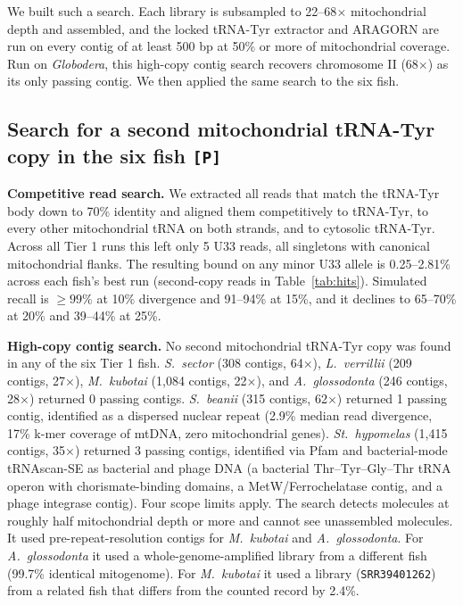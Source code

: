 \documentclass[11pt, a4paper]{article}
\begin{document}
We built such a search. Each library is subsampled to 22--68$\times$ mitochondrial depth and assembled, and the locked tRNA-Tyr extractor and ARAGORN are run on every contig of at least 500 bp at 50\% or more of mitochondrial coverage. Run on \textit{Globodera}, this high-copy contig search recovers chromosome II (68$\times$) as its only passing contig. We then applied the same search to the six fish.

\subsection{Search for a second mitochondrial tRNA-Tyr copy in the six fish \texttt{[P]}}\label{sec:second}
\textbf{Competitive read search.} We extracted all reads that match the tRNA-Tyr body down to 70\% identity and aligned them competitively to tRNA-Tyr, to every other mitochondrial tRNA on both strands, and to cytosolic tRNA-Tyr. Across all Tier 1 runs this left only 5 U33 reads, all singletons with canonical mitochondrial flanks. The resulting bound on any minor U33 allele is 0.25--2.81\% across each fish's best run (second-copy reads in Table~\ref{tab:hits}). Simulated recall is $\ge 99\%$ at 10\% divergence and 91--94\% at 15\%, and it declines to 65--70\% at 20\% and 39--44\% at 25\%.

\textbf{High-copy contig search.} No second mitochondrial tRNA-Tyr copy was found in any of the six Tier 1 fish. \textit{S.\ sector} (308 contigs, 64$\times$), \textit{L.\ verrillii} (209 contigs, 27$\times$), \textit{M.\ kubotai} (1,084 contigs, 22$\times$), and \textit{A.\ glossodonta} (246 contigs, 28$\times$) returned 0 passing contigs. \textit{S.\ beanii} (315 contigs, 62$\times$) returned 1 passing contig, identified as a dispersed nuclear repeat (2.9\% median read divergence, 17\% k-mer coverage of mtDNA, zero mitochondrial genes). \textit{St.\ hypomelas} (1,415 contigs, 35$\times$) returned 3 passing contigs, identified via Pfam and bacterial-mode tRNAscan-SE as bacterial and phage DNA (a bacterial Thr--Tyr--Gly--Thr tRNA operon with chorismate-binding domains, a MetW/Ferrochelatase contig, and a phage integrase contig). Four scope limits apply. The search detects molecules at roughly half mitochondrial depth or more and cannot see unassembled molecules. It used pre-repeat-resolution contigs for \textit{M.\ kubotai} and \textit{A.\ glossodonta}. For \textit{A.\ glossodonta} it used a whole-genome-amplified library from a different fish (99.7\% identical mitogenome). For \textit{M.\ kubotai} it used a library (\texttt{SRR39401262}) from a related fish that differs from the counted record by 2.4\%.
\end{document}
